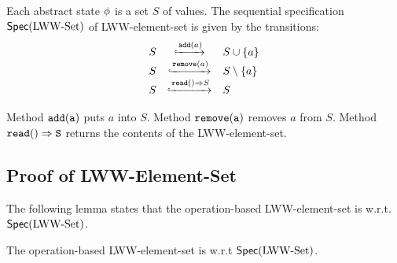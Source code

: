 Each abstract state $\abstate$ is a set $S$ of values. The sequential specification $\specLWWSet$ of LWW-element-set is given by the transitions:
\[
  \begin{array}{rcl}
    S &
               \specarrow{\alabelshort[\mathtt{add}]{a}}
    & S \cup \{ a \} \\
    S &
               \specarrow{\alabelshort[\mathtt{remove}]{a}}
    & S \setminus \{a\} \\
    S
    & \specarrow{\alabellong[\mathtt{read}]{}{ S }{}}
    & S
  \end{array}
\]

Method $\alabelshort[{\tt add}]{a}$ puts $a$ into $S$. Method $\alabelshort[{\tt remove}]{a}$ removes $a$ from $S$. Method $\alabellong[{\tt read}]{}{S}{}$ returns the contents of the LWW-element-set.



\subsection{Proof of LWW-Element-Set}
\label{subsec:proof of LWW-element-set}

The following lemma states that the operation-based LWW-element-set is \crdtlinearizable{} w.r.t. $\specLWWSet$.

\begin{lemma}
\label{lemma:operation-based LWW-element-set is correct}
The operation-based LWW-element-set is \crdtlinearizable{} w.r.t $\specLWWSet$.
\end{lemma}

